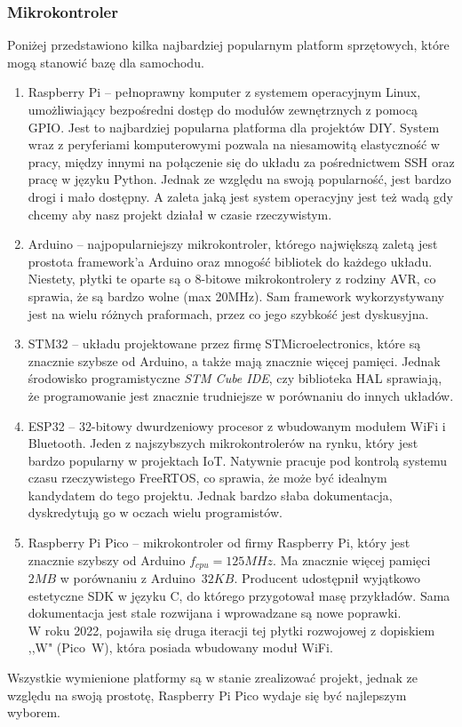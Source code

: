         \subsubsection{Mikrokontroler}
            Poniżej przedstawiono kilka najbardziej popularnym platform sprzętowych, które mogą stanowić bazę dla samochodu.
            \begin{enumerate}
                \item Raspberry Pi -- pełnoprawny komputer z systemem operacyjnym Linux, umożliwiający bezpośredni dostęp do modułów zewnętrznych z pomocą GPIO.
                Jest to najbardziej popularna platforma dla projektów DIY. System wraz z peryferiami komputerowymi pozwala na niesamowitą elastyczność w pracy, między innymi na połączenie się do układu za pośrednictwem SSH oraz pracę w języku Python.
                Jednak ze względu na swoją popularność, jest bardzo drogi i mało dostępny. 
                A zaleta jaką jest system operacyjny jest też wadą gdy chcemy aby nasz projekt działał w czasie rzeczywistym.
                \item Arduino -- najpopularniejszy mikrokontroler, którego największą zaletą jest prostota framework'a Arduino oraz mnogość bibliotek do każdego układu.
                Niestety, płytki te oparte są o 8-bitowe mikrokontrolery z rodziny AVR, co sprawia, że są bardzo wolne (max 20MHz). 
                Sam framework wykorzystywany jest na wielu różnych praformach, przez co jego szybkość jest dyskusyjna.
                \item STM32 -- układu projektowane przez firmę STMicroelectronics, które są znacznie szybsze od Arduino, a także mają znacznie więcej pamięci.
                Jednak środowisko programistyczne \textit{STM Cube IDE}, czy biblioteka HAL sprawiają, że programowanie jest znacznie trudniejsze w porównaniu do innych układów.
                \item ESP32 -- 32-bitowy dwurdzeniowy procesor z wbudowanym modułem WiFi i Bluetooth.
                Jeden z najszybszych mikrokontrolerów na rynku, który jest bardzo popularny w projektach IoT.
                Natywnie pracuje pod kontrolą systemu czasu rzeczywistego FreeRTOS, co sprawia, że może być idealnym kandydatem do tego projektu.
                Jednak bardzo słaba dokumentacja, dyskredytują go w oczach wielu programistów.
                \item Raspberry Pi Pico -- mikrokontroler od firmy Raspberry Pi, który jest znacznie szybszy od Arduino $f_{cpu} = 125MHz$.
                Ma znacznie więcej pamięci $2MB$ w porównaniu z Arduino~$32KB$.
                Producent udostępnił wyjątkowo estetyczne SDK w języku C, do którego przygotował masę przykładów.
                Sama dokumentacja jest stale rozwijana i wprowadzane są nowe poprawki.\\
                W roku 2022, pojawiła się druga iteracji tej płytki rozwojowej z dopiskiem ,,W" (Pico~W), która posiada wbudowany moduł WiFi.
            \end{enumerate}
            Wszystkie wymienione platformy są w stanie zrealizować projekt, jednak ze względu na swoją prostotę, Raspberry Pi Pico wydaje się być najlepszym wyborem.

